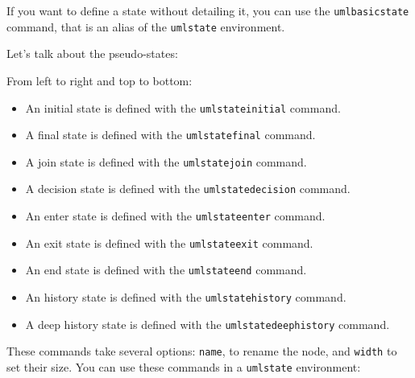 \documentclass[a4paper,11pt]{report}
\begin{document}
\medskip

If you want to define a state without detailing it, you can use the {\tt umlbasicstate} command, that is an alias of the {\tt umlstate} environment.

\medskip

Let's talk about the pseudo-states:

\medskip

\begin{minipage}{0.51\textwidth}
	
\end{minipage}
\begin{minipage}{0.49\textwidth}
	\begin{center}
	\end{center}
\end{minipage}

\medskip

From left to right and top to bottom:

\medskip

\begin{itemize}
	\item An initial state is defined with the {\tt umlstateinitial} command.
	\item A final state is defined with the {\tt umlstatefinal} command.
	\item A join state is defined with the {\tt umlstatejoin} command.
	\item A decision state is defined with the {\tt umlstatedecision} command.
	\item An enter state is defined with the {\tt umlstateenter} command.
	\item An exit state is defined with the {\tt umlstateexit} command.
	\item An end state is defined with the {\tt umlstateend} command.
	\item An history state is defined with the {\tt umlstatehistory} command.
	\item A deep history state is defined with the {\tt umlstatedeephistory} command.
\end{itemize}

\medskip

These commands take several options: {\tt name}, to rename the node, and {\tt width} to set their size. You can use these commands in a {\tt umlstate} environment:

\medskip

\begin{minipage}{0.51\textwidth}
	
\end{minipage}
\begin{minipage}{0.49\textwidth}
	\begin{center}
	\end{center}
\end{minipage}
\end{document}
